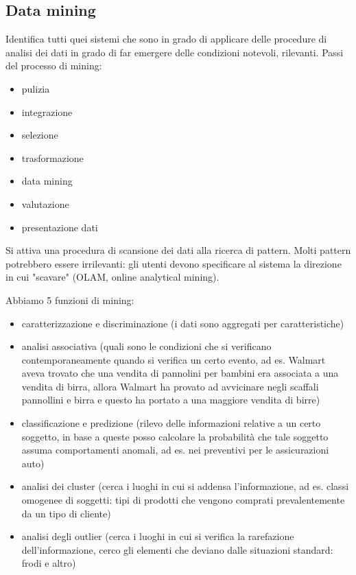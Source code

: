 \subsection{Data mining}\label{data-mining}

Identifica tutti quei sistemi che sono in grado di applicare delle
procedure di analisi dei dati in grado di far emergere delle condizioni notevoli, rilevanti. Passi del processo di mining:

\begin{itemize}

\item
  pulizia
\item
  integrazione
\item
  selezione
\item
  trasformazione
\item
  data mining
\item
  valutazione
\item
  presentazione dati
\end{itemize}

Si attiva una procedura di scansione dei dati alla ricerca di pattern.
Molti pattern potrebbero essere irrilevanti: gli utenti devono
specificare al sistema la direzione in cui "scavare"  (OLAM, online analytical mining).

Abbiamo 5 funzioni di mining:

\begin{itemize}

\item
  caratterizzazione e discriminazione (i dati sono aggregati per
  caratteristiche)
\item
  analisi associativa (quali sono le condizioni che si verificano
  contemporaneamente quando si verifica un certo evento, ad es. Walmart
  aveva trovato che una vendita di pannolini per bambini era associata a
  una vendita di birra, allora Walmart ha provato ad avvicinare negli
  scaffali pannollini e birra e questo ha portato a una maggiore vendita
  di birre)
\item
  classificazione e predizione (rilevo delle informazioni relative a un
  certo soggetto, in base a queste posso calcolare la probabilit\`a che
  tale soggetto assuma comportamenti anomali, ad es. nei preventivi per
  le assicurazioni auto)
\item
  analisi dei cluster (cerca i luoghi in cui si addensa l'informazione, ad es. classi omogenee di soggetti: tipi di prodotti che vengono comprati
  prevalentemente da un tipo di cliente)
\item
  analisi degli outlier (cerca i luoghi in cui si verifica la
  rarefazione dell'informazione, cerco gli elementi che deviano dalle situazioni standard: frodi e altro)
\end{itemize}

